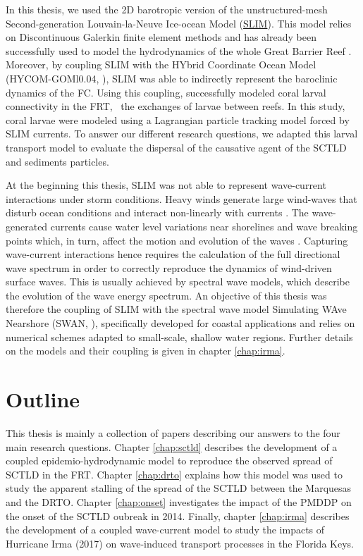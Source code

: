 In this thesis, we used the 2D barotropic version of the unstructured-mesh Second-generation Louvain-la-Neuve Ice-ocean Model (\href{https://www.slim-ocean.be/}{SLIM}). This model relies on Discontinuous Galerkin finite element methods \citep{aizinger2002discontinuous} and has already been successfully used to model the hydrodynamics of the whole Great Barrier Reef \citep{lambrechts2008multi}. Moreover, by coupling SLIM with the HYbrid Coordinate Ocean Model (HYCOM-GOMl0.04, \citealp{chassignet2007hycom}), SLIM was able to indirectly represent the baroclinic dynamics of the FC. Using this coupling, \cite{frys2020fine} successfully modeled coral larval connectivity in the FRT, \ie~the exchanges of larvae between reefs. In this study, coral larvae were modeled using a Lagrangian particle tracking model forced by SLIM currents. To answer our different research questions, we adapted this larval transport model to evaluate the dispersal of the causative agent of the SCTLD and sediments particles. 

At the beginning this thesis, SLIM was not able to represent wave-current interactions under storm conditions. Heavy winds generate large wind-waves that disturb ocean conditions and interact non-linearly with currents \citep{liu2020impacts,wu2011fvcom}. The wave-generated currents cause water level variations near shorelines and wave breaking points which, in turn, affect the motion and evolution of the waves \citep{longuet1970longshore, sikiric2013coupling}. Capturing wave-current interactions hence requires the calculation of the full directional wave spectrum in order to correctly reproduce the dynamics of wind-driven surface waves. This is usually achieved by spectral wave models, which describe the evolution of the wave energy spectrum. An objective of this thesis was therefore the coupling of SLIM with the spectral wave model Simulating WAve Nearshore (SWAN, \citealp{booij1999third}), specifically developed for coastal applications and relies on numerical schemes adapted to small-scale, shallow water regions. Further details on the models and their coupling is given in chapter \ref{chap:irma}.

\section*{Outline}
This thesis is mainly a collection of papers describing our answers to the four main research questions. Chapter \ref{chap:sctld} describes the development of a coupled epidemio-hydrodynamic model to reproduce the observed spread of SCTLD in the FRT. Chapter \ref{chap:drto} explains how this model was used to study the apparent stalling of the spread of the SCTLD between the Marquesas and the DRTO. Chapter \ref{chap:onset} investigates the impact of the PMDDP on the onset of the SCTLD oubreak in 2014. Finally, chapter \ref{chap:irma} describes the development of a coupled wave-current model to study the impacts of Hurricane Irma (2017) on wave-induced transport processes in the Florida Keys. 

